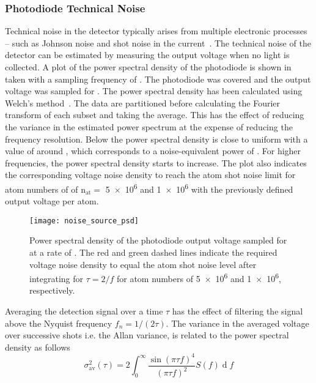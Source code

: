 \subsubsection{Photodiode Technical Noise}
Technical noise in the detector typically arises from multiple electronic processes -- such as Johnson noise and shot noise in
the current~\cite{Howard2002}. The technical noise of the detector can
be estimated by measuring the output voltage when no light is
collected. A plot of the power spectral density of the photodiode is
shown in~ taken
with a sampling frequency of . The
photodiode was covered and the output voltage was sampled for
. The power spectral density has been calculated
using Welch's method~\cite{Welch1967}. The data are partitioned before
calculating the Fourier transform of each subset and taking the
average. This has the effect of reducing the variance in the estimated
power spectrum at the expense of reducing the frequency resolution.
Below  the power spectral density is close
to uniform with a value of around
, which corresponds to a
noise-equivalent power of .
For higher frequencies, the power spectral density starts to
increase. The plot also indicates the corresponding voltage noise
density to reach the
atom shot noise limit for atom numbers of 
of n\(_\text{at} =\) \num{5e6} and \num{1e6} with the previously
defined output voltage per atom. 
\begin{figure}[htpb!]
  \centering
  \texttt{[image: noise\_source\_psd]}
  \caption[Photodiode power spectral density]{Power spectral density of the photodiode output voltage
  sampled for  at a rate of
. The red and green dashed lines indicate
the required voltage noise density to equal the atom shot noise level
after integrating for \(\tau = 2/f\)\sivalue{}{\s} for atom numbers of
\num{5e6} and \num{1e6}, respectively.}
  \label{fig:noise_source_psd}
\end{figure}
Averaging the detection signal over a time \(\tau\) has the effect of
filtering the signal above the Nyquist frequency \(f_n = 1/(2 \tau)\).
The variance in the averaged voltage over successive shots
i.e. the Allan variance, is related to the power spectral density as
follows
\begin{equation}
  \sigma^2_\text{av}(\tau) = 2 \int_0^\infty \frac{\sin(\pi \tau f)^4}{(\pi \tau f)^2}S(f)\;\mathrm{d}\;f
  \label{eq:av_psd}
\end{equation}
